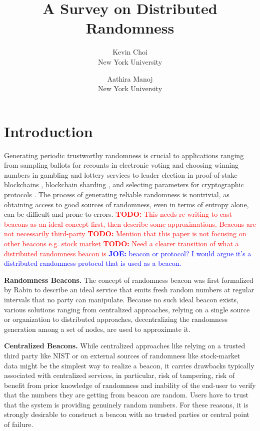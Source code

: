 \documentclass[letterpaper,twocolumn,10pt]{article}
\title{\Large \bf A Survey on Distributed Randomness}
\author{
{\rm Kevin Choi}\\
New York University
\and
{\rm Aathira Manoj}\\
New York University
}
\theoremstyle{definition}
\theoremstyle{remark}
\newcommand{\todo}[1]{\textcolor{red}{\textbf{TODO:} #1}}
\newcommand{\joenote}[1]{\textcolor{blue}{\textbf{JOE:} #1}}
\begin{document}
\maketitle
\tableofcontents

\section{Introduction}
Generating periodic trustworthy randomness is crucial to applications ranging from sampling ballots for recounts in electronic voting \cite{adida2008helios} and choosing winning numbers in gambling and lottery services \cite{bonneau2015bitcoin} to leader election in proof-of-stake blockchains \cite{gilad2017algorand, kiayias2017ouroboros}, blockchain sharding \cite{al2017chainspace, kokoris2018omniledger, luu2016secure}, and selecting parameters for cryptographic protocols \cite{baigneres2015trap, lenstra2015random}. The process of generating reliable randomness is nontrivial, as obtaining access to good sources of randomness, even in terms of entropy alone, can be difficult and prone to errors.
\todo{This needs re-writing to cast beacons as an ideal concept first, then describe some approximations. Beacons are not necessarily third-party}
\todo{Mention that this paper is not focusing on other beacons e.g. stock market}
\todo{Need a clearer transition of what a distributed randomness beacon is} \joenote{beacon or protocol? I would argue it's a distributed randomness protocol that is used as a beacon.}

\textbf{Randomness Beacons.} The concept of randomness beacon was first formalized by Rabin \cite{rabin1983Rabin} to describe an ideal service that emits fresh random numbers at regular intervals that no party can manipulate. Because no such ideal beacon exists, various solutions ranging from  centralized approaches, relying on a single source or organization to distributed approaches, decentralizing the randomness generation among a set of nodes, are used to approximate it. 

\textbf{Centralized Beacons.} While centralized approaches like relying on a trusted third party like NIST \cite{fischer2011public} or on external sources of randomness like stock-market data \cite{clark2010use} might be the simplest way to realize a beacon, it carries drawbacks typically associated with centralized services, in particular, risk of tampering, risk of benefit from prior knowledge of randomness and inability of the end-user to verify that the numbers they are getting from beacon are random. Users have to trust that the system is providing genuinely random numbers. For these reasons, it is strongly desirable to construct a beacon with no trusted parties or central point of failure. 
\end{document}
